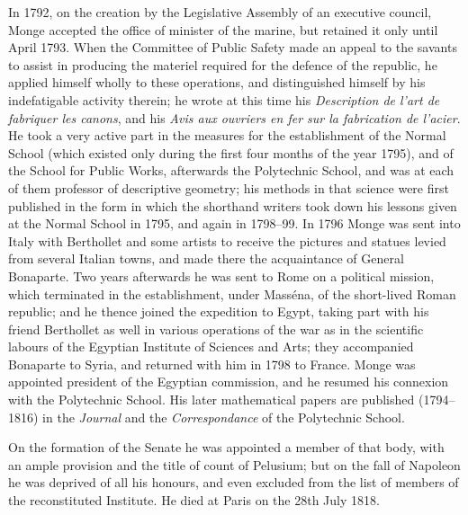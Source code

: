 \documentclass[11pt,a4paper]{article}
\begin{document}
In 1792, on the creation by the Legislative Assembly of an executive council, Monge accepted the office of minister of the marine, but retained it only until April 1793. When the Committee of Public Safety made an appeal to the savants to assist in producing the materiel required for the defence of the republic, he applied himself wholly to these operations, and distinguished himself by his indefatigable activity therein; he wrote at this time his \textit{Description de l'art de fabriquer les canons}, and his \textit{Avis aux ouvriers en fer sur la fabrication de l'acier}. He took a very active part in the measures for the establishment of the Normal School (which existed only during the first four months of the year 1795), and of the School for Public Works, afterwards the Polytechnic School, and was at each of them professor of descriptive geometry; his methods in that science were first published in the form in which the shorthand writers took down his lessons given at the Normal School in 1795, and again in 1798--99. In 1796 Monge was sent into Italy with Berthollet and some artists to receive the pictures and statues levied from several Italian towns, and made there the acquaintance of General Bonaparte. Two years afterwards he was sent to Rome on a political mission, which terminated in the establishment, under Mass\'ena, of the short-lived Roman republic; and he thence joined the expedition to Egypt, taking part with his friend Berthollet as well in various operations of the war as in the scientific labours of the Egyptian Institute of Sciences and Arts; they accompanied Bonaparte to Syria, and returned with him in 1798 to France. Monge was appointed president of the Egyptian commission, and he resumed his connexion with the Polytechnic School. His later mathematical papers are published (1794--1816) in the \textit{Journal} and the \textit{Correspondance} of the Polytechnic School.

On the formation of the Senate he was appointed a member of that body, with an ample provision and the title of count of Pelusium; but on the fall of Napoleon he was deprived of all his honours, and even excluded from the list of members of the reconstituted Institute. He died at Paris on the 28th July 1818.
\end{document}
